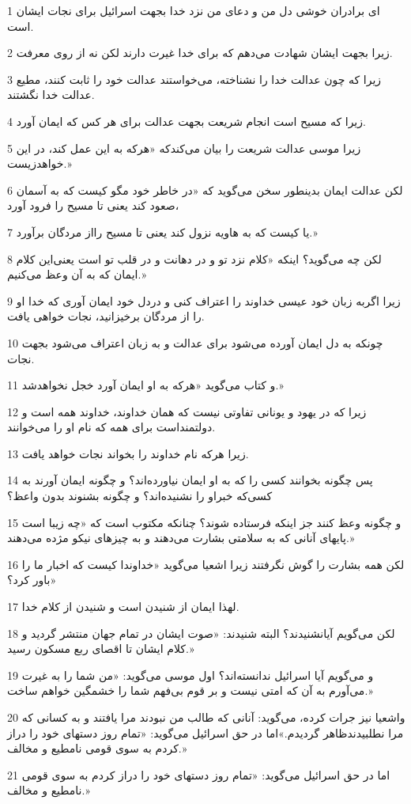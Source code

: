 \par 1 ای برادران خوشی دل من و دعای من نزد خدا بجهت اسرائیل برای نجات ایشان است.
\par 2 زیرا بجهت ایشان شهادت می‌دهم که برای خدا غیرت دارند لکن نه از روی معرفت.
\par 3 زیرا که چون عدالت خدا را نشناخته، می‌خواستند عدالت خود را ثابت کنند، مطیع عدالت خدا نگشتند.
\par 4 زیرا که مسیح است انجام شریعت بجهت عدالت برای هر کس که ایمان آورد.
\par 5 زیرا موسی عدالت شریعت را بیان می‌کندکه «هر‌که به این عمل کند، در این خواهدزیست.»
\par 6 لکن عدالت ایمان بدینطور سخن می‌گوید که «در خاطر خود مگو کیست که به آسمان صعود کند یعنی تا مسیح را فرود آورد،
\par 7 یا کیست که به هاویه نزول کند یعنی تا مسیح رااز مردگان برآورد.»
\par 8 لکن چه می‌گوید؟ اینکه «کلام نزد تو و در دهانت و در قلب تو است یعنی‌این کلام ایمان که به آن وعظ می‌کنیم.»
\par 9 زیرا اگربه زبان خود عیسی خداوند را اعتراف کنی و دردل خود ایمان آوری که خدا او را از مردگان برخیزانید، نجات خواهی یافت.
\par 10 چونکه به دل ایمان آورده می‌شود برای عدالت و به زبان اعتراف می‌شود بجهت نجات.
\par 11 و کتاب می‌گوید «هر‌که به او ایمان آورد خجل نخواهدشد.»
\par 12 زیرا که در یهود و یونانی تفاوتی نیست که همان خداوند، خداوند همه است و دولتمنداست برای همه که نام او را می‌خوانند.
\par 13 زیرا هرکه نام خداوند را بخواند نجات خواهد یافت.
\par 14 پس چگونه بخوانند کسی را که به او ایمان نیاورده‌اند؟ و چگونه ایمان آورند به کسی‌که خبراو را نشنیده‌اند؟ و چگونه بشنوند بدون واعظ؟
\par 15 و چگونه وعظ کنند جز اینکه فرستاده شوند؟ چنانکه مکتوب است که «چه زیبا است پایهای آنانی که به سلامتی بشارت می‌دهند و به چیزهای نیکو مژده می‌دهند.»
\par 16 لکن همه بشارت را گوش نگرفتند زیرا اشعیا می‌گوید «خداوندا کیست که اخبار ما را باور کرد؟»
\par 17 لهذا ایمان از شنیدن است و شنیدن از کلام خدا.
\par 18 لکن می‌گویم آیانشنیدند؟ البته شنیدند: «صوت ایشان در تمام جهان منتشر گردید و کلام ایشان تا اقصای ربع مسکون رسید.»
\par 19 و می‌گویم آیا اسرائیل ندانسته‌اند؟ اول موسی می‌گوید: «من شما را به غیرت می‌آورم به آن که امتی نیست و بر قوم بی‌فهم شما را خشمگین خواهم ساخت.»
\par 20 واشعیا نیز جرات کرده، می‌گوید: آنانی که طالب من نبودند مرا یافتند و به کسانی که مرا نطلبیدندظاهر گردیدم.»اما در حق اسرائیل می‌گوید: «تمام روز دستهای خود را دراز کردم به سوی قومی نامطیع و مخالف.»
\par 21 اما در حق اسرائیل می‌گوید: «تمام روز دستهای خود را دراز کردم به سوی قومی نامطیع و مخالف.»

